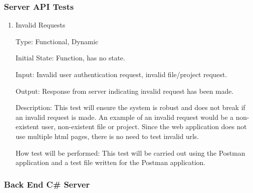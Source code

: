 \documentclass[12pt, titlepage]{article}
\begin{document}
  \subsubsection{Server API Tests}

    \begin{enumerate}

      \item{Invalid Requests\\}

      Type: Functional, Dynamic

      Initial State: Function, has no state.

      Input: Invalid user authentication request, invalid file/project request.

      Output: Response from server indicating invalid request has been made.
                
      Description: This test will ensure the system is robust and does not break
      if an invalid request is made. An example of an invalid request would be a
      non-existent user, non-existent file or project. Since the web application
      does not use multiple html pages, there is no need to test invalid urls.

      How test will be performed: This test will be carried out using the Postman
      application and a test file written for the Postman application.

    \end{enumerate}

  \subsubsection{Back End C\# Server}
\end{document}
